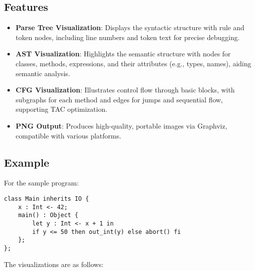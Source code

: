 \documentclass[11pt, titlepage]{article}
\begin{document}
\subsection{Features}
\begin{itemize}[leftmargin=*]
    \item \textbf{Parse Tree Visualization}: Displays the syntactic structure with rule and token nodes, including line numbers and token text for precise debugging.
    \item \textbf{AST Visualization}: Highlights the semantic structure with nodes for classes, methods, expressions, and their attributes (e.g., types, names), aiding semantic analysis.
    \item \textbf{CFG Visualization}: Illustrates control flow through basic blocks, with subgraphs for each method and edges for jumps and sequential flow, supporting TAC optimization.
    \item \textbf{PNG Output}: Produces high-quality, portable images via Graphviz, compatible with various platforms.
\end{itemize}

\subsection{Example}
For the sample program:
\begin{lstlisting}
class Main inherits IO {
    x : Int <- 42;
    main() : Object {
        let y : Int <- x + 1 in
        if y <= 50 then out_int(y) else abort() fi
    };
};
\end{lstlisting}
The visualizations are as follows:
\end{document}
